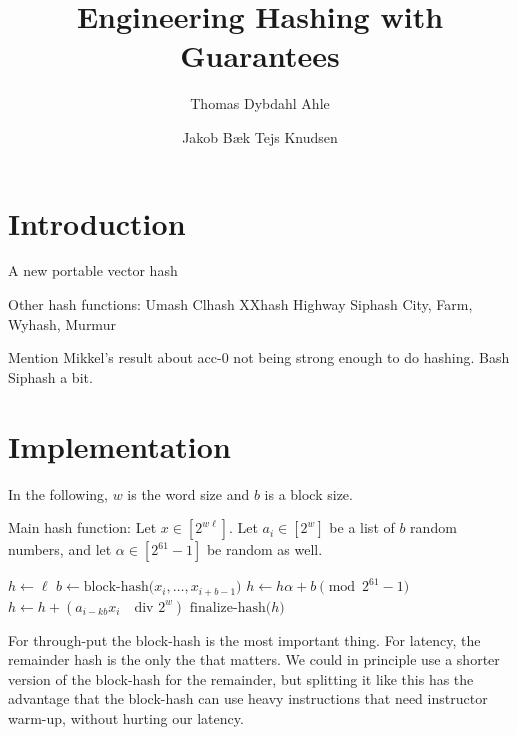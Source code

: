 

\renewcommand{\div}{\quad\text{div }}

\author{Thomas Dybdahl Ahle \and Jakob Bæk Tejs Knudsen}
\title{Engineering Hashing with Guarantees}

\maketitle

\section{Introduction}

A new portable vector hash

Other hash functions:
Umash
Clhash
XXhash
Highway
Siphash
City, Farm, Wyhash, Murmur

Mention Mikkel's result about acc-0 not being strong enough to do hashing.
Bash Siphash a bit.

\section{Implementation}

In the following, $w$ is the word size and $b$ is a block size.
\begin{algorithm}[H]
   \caption{
      Main hash function:
      Let $x\in[2^{w\ell}]$.
      Let $a_i\in[2^w]$ be a list of $b$ random numbers,
      and let $\alpha\in[2^{61}-1]$ be random as well.
   }
   \begin{algorithmic}
      \State $h\gets \ell$
         \State $b\gets \text{block-hash($x_i,\dots,x_{i+b-1}$)}$
         \State $h\gets h\alpha + b \pmod{2^{61}-1}$
      \EndFor
         \State $h\gets h + (a_{i-kb} x_i \div 2^w)$
      \EndFor
      \State \Return $\text{finalize-hash($h$)}$
   \end{algorithmic}
\end{algorithm}

For through-put the block-hash is the most important thing.
For latency, the remainder hash is the only the that matters.
We could in principle use a shorter version of the block-hash for the remainder,
but splitting it like this has the advantage that the block-hash can use heavy instructions that need instructor warm-up, without hurting our latency.

